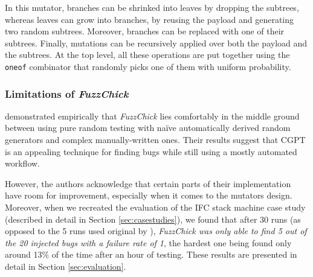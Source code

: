 \documentclass[acmsmall, anonymous]{acmart}
\newcommand{\fuzzchick}{\textit{FuzzChick}\xspace}
\begin{document}


In this mutator, branches can be shrinked into leaves by dropping the subtrees,
whereas leaves can grow into branches, by reusing the payload and generating two
random subtrees.
%
Moreover, branches can be replaced with one of their subtrees.
%
Finally, mutations can be recursively applied over both the payload and the
subtrees.
%
At the top level, all these operations are put together using the \texttt{oneof}
combinator that randomly picks one of them with uniform probability.

%
%
\subsubsection{Limitations of \fuzzchick}

\citeauthor{lampropoulos2019coverage} demonstrated empirically that \fuzzchick
lies comfortably in the middle ground between using pure random testing with
na\"ive automatically derived random generators and complex manually-written
ones.
%
Their results suggest that CGPT is an appealing technique for finding bugs while
still using a mostly automated workflow.

However, the authors acknowledge that certain parts of their implementation have
room for improvement, especially when it comes to the mutators design.
%
Moreover, when we recreated the evaluation of the IFC stack machine case study
(described in detail in Section \ref{sec:casestudies}), we found that after 30
runs (as opposed to the 5 runs used original by
\citeauthor{lampropoulos2019coverage}), \emph{\fuzzchick was only able to find 5
  out of the 20 injected bugs with a failure rate of 1}, the hardest one being
found only around 13\% of the time after an hour of testing.
%
These results are presented in detail in Section \ref{sec:evaluation}.
\end{document}
